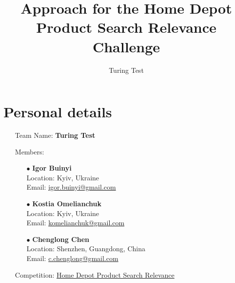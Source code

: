 \documentclass[12pt]{article}
\begin{document}
\title{Approach for the Home Depot Product Search Relevance Challenge}
\author{Turing Test}
\maketitle

\section*{Personal details}
\begin{itemize}
\item[] Team Name: \textbf{Turing Test}
\item[] Members:
\begin{itemize}
\item[$\bullet$] \textbf{Igor Buinyi} \\
	 Location: Kyiv, Ukraine \\
	Email: \url{igor.buinyi@gmail.com}
\item[$\bullet$] \textbf{Kostia Omelianchuk} \\
	 Location: Kyiv, Ukraine \\
	Email: \url{komelianchuk@gmail.com}
\item[$\bullet$] \textbf{Chenglong Chen} \\
	 Location: Shenzhen, Guangdong, China\\
	Email: \url{c.chenglong@gmail.com}
\end{itemize}
\item[] Competition: \href{https://www.kaggle.com/c/home-depot-product-search-relevance}{Home Depot Product Search Relevance}
\end{itemize}
\end{document}
